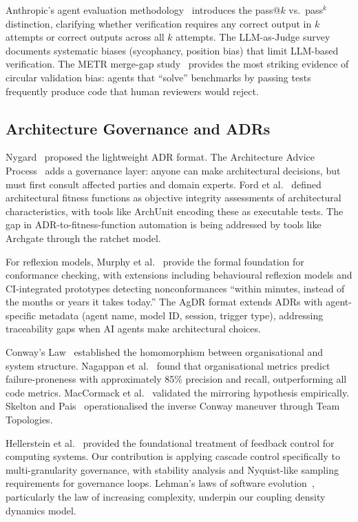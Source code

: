Anthropic's agent evaluation methodology~\citep{anthropic2026evals} introduces the pass@$k$ vs.\ pass$^k$ distinction, clarifying whether verification requires any correct output in $k$ attempts or correct outputs across all $k$ attempts. The LLM-as-Judge survey~\citep{li2024survey} documents systematic biases (sycophancy, position bias) that limit LLM-based verification. The METR merge-gap study~\citep{metr2026swebench} provides the most striking evidence of circular validation bias: agents that ``solve'' benchmarks by passing tests frequently produce code that human reviewers would reject.


\subsection{Architecture Governance and ADRs}

Nygard~\citep{nygard2011} proposed the lightweight ADR format. The Architecture Advice Process~\citep{harmellaw2023} adds a governance layer: anyone can make architectural decisions, but must first consult affected parties and domain experts. Ford et al.~\citep{ford2017} defined architectural fitness functions as objective integrity assessments of architectural characteristics, with tools like ArchUnit encoding these as executable tests. The gap in ADR-to-fitness-function automation is being addressed by tools like Archgate through the ratchet model.

For reflexion models, Murphy et al.~\citep{murphy1995, murphy2001} provide the formal foundation for conformance checking, with extensions including behavioural reflexion models and CI-integrated prototypes detecting nonconformances ``within minutes, instead of the months or years it takes today.'' The AgDR format extends ADRs with agent-specific metadata (agent name, model ID, session, trigger type), addressing traceability gaps when AI agents make architectural choices.

Conway's Law~\citep{conway1968} established the homomorphism between organisational and system structure. Nagappan et al.~\citep{nagappan2008} found that organisational metrics predict failure-proneness with approximately 85\% precision and recall, outperforming all code metrics. MacCormack et al.~\citep{maccormack2008} validated the mirroring hypothesis empirically. Skelton and Pais~\citep{skelton2019} operationalised the inverse Conway maneuver through Team Topologies.

Hellerstein et al.~\citep{hellerstein2004} provided the foundational treatment of feedback control for computing systems. Our contribution is applying cascade control specifically to multi-granularity governance, with stability analysis and Nyquist-like sampling requirements for governance loops. Lehman's laws of software evolution~\citep{Lehman1980}, particularly the law of increasing complexity, underpin our coupling density dynamics model.

